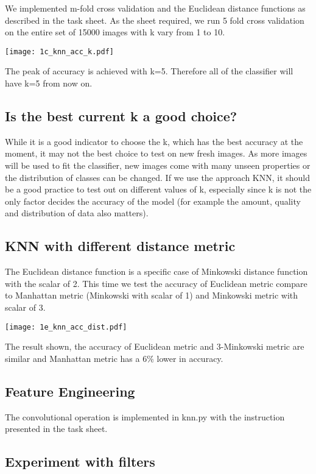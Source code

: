 \documentclass[11pt]{article}
\begin{document}
We implemented m-fold cross validation and the Euclidean distance functions as described in the task sheet. As the sheet required, we run 5 fold cross validation on the entire set of 15000 images with k vary from 1 to 10.

\texttt{[image: 1c\_knn\_acc\_k.pdf]}

The peak of accuracy is achieved with k=5. Therefore all of the classifier will have k=5 from now on.

\subsection{Is the best current k a good choice?}

While it is a good indicator to choose the k, which has the best accuracy at the moment, it may not the best choice to test on new fresh images. As more images will be used to fit the classifier, new images come with many unseen properties or the distribution of classes can be changed. If we use the approach KNN, it should be a good practice to test out on different values of k, especially since k is not the only factor decides the accuracy of the model (for example the amount, quality and distribution of data also matters).

\subsection{KNN with different distance metric}

The Euclidean distance function is a specific case of Minkowski distance function with the scalar of 2. This time we test the accuracy of Euclidean metric compare to Manhattan metric (Minkowski with scalar of 1) and Minkowski metric with scalar of 3.

\texttt{[image: 1e\_knn\_acc\_dist.pdf]}

The result shown, the accuracy of Euclidean metric and 3-Minkowski metric are similar and Manhattan metric has a 6\% lower in accuracy.

\subsection{Feature Engineering}

The convolutional operation is implemented in knn.py with the instruction presented in the task sheet.

\subsection{Experiment with filters}
\end{document}
